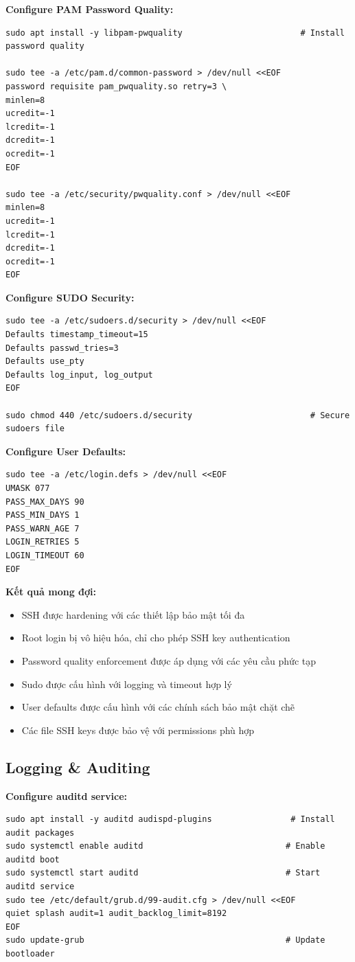 \noindent \textbf{Configure PAM Password Quality:}
\begin{verbatim}
sudo apt install -y libpam-pwquality                        # Install password quality

sudo tee -a /etc/pam.d/common-password > /dev/null <<EOF
password requisite pam_pwquality.so retry=3 \
minlen=8 
ucredit=-1 
lcredit=-1 
dcredit=-1 
ocredit=-1
EOF

sudo tee -a /etc/security/pwquality.conf > /dev/null <<EOF
minlen=8
ucredit=-1
lcredit=-1
dcredit=-1
ocredit=-1
EOF
\end{verbatim}

\noindent \textbf{Configure SUDO Security:}
\begin{verbatim}
sudo tee -a /etc/sudoers.d/security > /dev/null <<EOF
Defaults timestamp_timeout=15
Defaults passwd_tries=3
Defaults use_pty
Defaults log_input, log_output
EOF

sudo chmod 440 /etc/sudoers.d/security                        # Secure sudoers file
\end{verbatim}

\noindent \textbf{Configure User Defaults:}
\begin{verbatim}
sudo tee -a /etc/login.defs > /dev/null <<EOF
UMASK 077
PASS_MAX_DAYS 90
PASS_MIN_DAYS 1
PASS_WARN_AGE 7
LOGIN_RETRIES 5
LOGIN_TIMEOUT 60
EOF
\end{verbatim}

\noindent \textbf{Kết quả mong đợi:}
\begin{itemize}
\item SSH được hardening với các thiết lập bảo mật tối đa
\item Root login bị vô hiệu hóa, chỉ cho phép SSH key authentication
\item Password quality enforcement được áp dụng với các yêu cầu phức tạp
\item Sudo được cấu hình với logging và timeout hợp lý
\item User defaults được cấu hình với các chính sách bảo mật chặt chẽ
\item Các file SSH keys được bảo vệ với permissions phù hợp
\end{itemize}

\subsection{Logging \& Auditing}

\noindent \textbf{Configure auditd service:}
\begin{verbatim}
sudo apt install -y auditd audispd-plugins                # Install audit packages
sudo systemctl enable auditd                             # Enable auditd boot
sudo systemctl start auditd                              # Start auditd service
sudo tee /etc/default/grub.d/99-audit.cfg > /dev/null <<EOF
quiet splash audit=1 audit_backlog_limit=8192
EOF
sudo update-grub                                         # Update bootloader
\end{verbatim}

